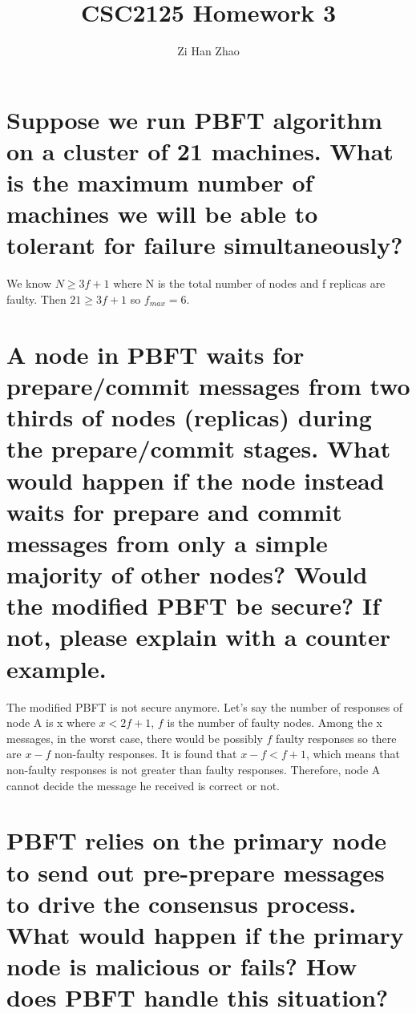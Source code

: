 \documentclass{article}
\author{Zi Han Zhao}
\affil{1001103708}
\date{}
\title{CSC2125 Homework 3}
\begin{document}
\maketitle
\renewcommand{\thesubsection}{(\alph{subsection})}
\section{Suppose we run PBFT algorithm on a cluster of 21 machines. What is the
maximum number of machines we will be able to tolerant for failure
simultaneously?}
We know $N\geqslant3f+1$ where N is the total number of nodes and f replicas are faulty. Then $21\geqslant3f+1$ so $f_{max}=6$.
\section{A node in PBFT waits for prepare/commit messages from two thirds of nodes
(replicas) during the prepare/commit stages. What would happen if the node
instead waits for prepare and commit messages from only a simple majority of
other nodes? Would the modified PBFT be secure? If not, please explain with a
counter example.}
The modified PBFT is not secure anymore.
Let's say the number of responses of node A is x where $x<2f+1$, 
$f$ is the number of faulty nodes. Among the x messages, 
in the worst case, 
there would be possibly $f$ faulty responses so there are $x-f$ non-faulty responses. 
It is found that $x-f<f+1$, 
which means that non-faulty responses is not greater than faulty responses. 
Therefore, node A cannot decide the message he received is correct or not.
\section{PBFT relies on the primary node to send out pre-prepare messages to drive the
consensus process. What would happen if the primary node is malicious or fails?
How does PBFT handle this situation?}
\end{document}
